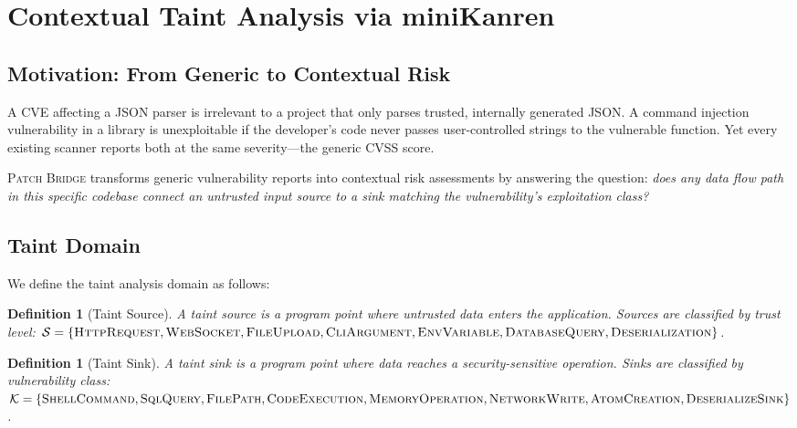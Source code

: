 \documentclass[11pt,twocolumn]{article}
\newtheorem{definition}[theorem]{Definition}
\begin{document}
\section{Contextual Taint Analysis via miniKanren}
\label{sec:taint}

\subsection{Motivation: From Generic to Contextual Risk}

A CVE affecting a JSON parser is irrelevant to a project that only
parses trusted, internally generated JSON. A command injection
vulnerability in a library is unexploitable if the developer's code
never passes user-controlled strings to the vulnerable function. Yet
every existing scanner reports both at the same severity---the generic
CVSS score.

\textsc{Patch Bridge} transforms generic vulnerability reports into
contextual risk assessments by answering the question: \emph{does any
data flow path in this specific codebase connect an untrusted input
source to a sink matching the vulnerability's exploitation class?}

\subsection{Taint Domain}

We define the taint analysis domain as follows:

\begin{definition}[Taint Source]
A \emph{taint source} is a program point where untrusted data enters
the application. Sources are classified by trust level:
$\mathcal{S} = \{\textsc{HttpRequest}, \textsc{WebSocket},
\textsc{FileUpload}, \textsc{CliArgument}, \textsc{EnvVariable},
\textsc{DatabaseQuery}, \textsc{Deserialization}\}$.
\end{definition}

\begin{definition}[Taint Sink]
A \emph{taint sink} is a program point where data reaches a
security-sensitive operation. Sinks are classified by vulnerability
class:
$\mathcal{K} = \{\textsc{ShellCommand}, \textsc{SqlQuery},
\textsc{FilePath}, \textsc{CodeExecution}, \textsc{MemoryOperation},
\textsc{NetworkWrite}, \textsc{AtomCreation},
\textsc{DeserializeSink}\}$.
\end{definition}
\end{document}

